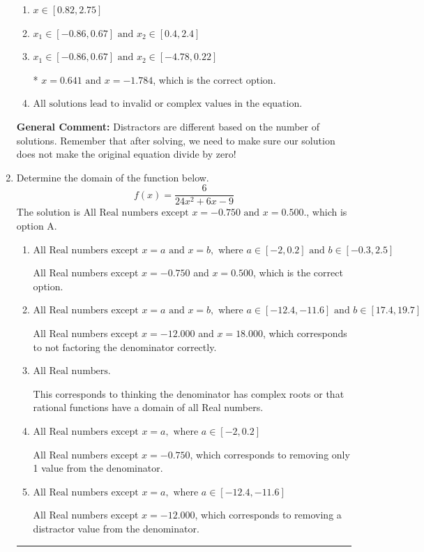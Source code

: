 \documentclass{extbook}[14pt]
\newcommand{\litem}[1]{\item #1

\rule{\textwidth}{0.4pt}}
\begin{document}
\begin{enumerate}
{\begin{enumerate}[label=\Alph*.]
\item \( x \in [0.82,2.75] \)


\item \( x_1 \in [-0.86, 0.67] \text{ and } x_2 \in [0.4,2.4] \)


\item \( x_1 \in [-0.86, 0.67] \text{ and } x_2 \in [-4.78,0.22] \)

* $x = 0.641 \text{ and } x = -1.784$, which is the correct option.
\item \( \text{All solutions lead to invalid or complex values in the equation.} \)


\end{enumerate}

\textbf{General Comment:} Distractors are different based on the number of solutions. Remember that after solving, we need to make sure our solution does not make the original equation divide by zero!
}
\litem{
Determine the domain of the function below.
\[ f(x) = \frac{6}{24x^{2} +6 x -9} \]The solution is \( \text{All Real numbers except } x = -0.750 \text{ and } x = 0.500. \), which is option A.\begin{enumerate}[label=\Alph*.]
\item \( \text{All Real numbers except } x = a \text{ and } x = b, \text{ where } a \in [-2, 0.2] \text{ and } b \in [-0.3, 2.5] \)

All Real numbers except $x = -0.750$ and $x = 0.500$, which is the correct option.
\item \( \text{All Real numbers except } x = a \text{ and } x = b, \text{ where } a \in [-12.4, -11.6] \text{ and } b \in [17.4, 19.7] \)

All Real numbers except $x = -12.000$ and $x = 18.000$, which corresponds to not factoring the denominator correctly.
\item \( \text{All Real numbers.} \)

This corresponds to thinking the denominator has complex roots or that rational functions have a domain of all Real numbers.
\item \( \text{All Real numbers except } x = a, \text{ where } a \in [-2, 0.2] \)

All Real numbers except $x = -0.750$, which corresponds to removing only 1 value from the denominator.
\item \( \text{All Real numbers except } x = a, \text{ where } a \in [-12.4, -11.6] \)

All Real numbers except $x = -12.000$, which corresponds to removing a distractor value from the denominator.
\end{enumerate}

}
\end{enumerate}
\end{document}
